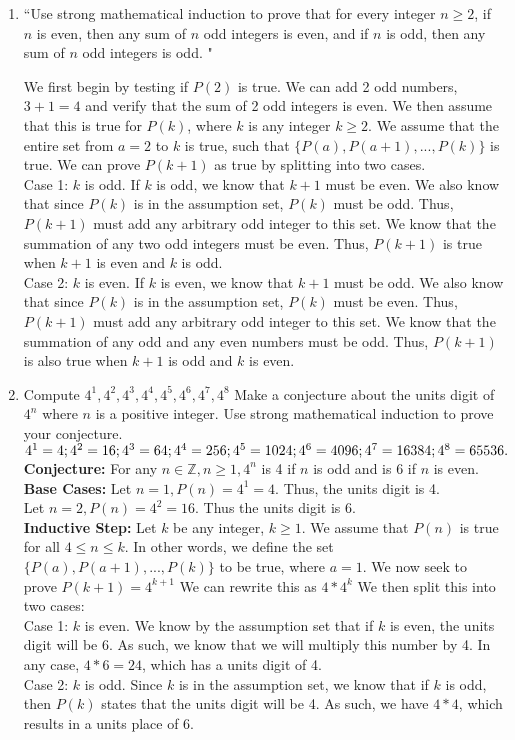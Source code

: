 \documentclass{article}
\makeatletter
\newcommand\setItemnumber[1]{\setcounter{enum\romannumeral\@enumdepth}{\numexpr#1-1\relax}}
\makeatother
\begin{document}
\begin{enumerate}
    \setItemnumber{16}
    \item ``Use strong mathematical induction to prove that for every integer $n\geq2$, if $n$ is even, then any sum of $n$ odd integers is even, and if $n$ is odd, then any sum of $n$ odd integers is odd. "

    We first begin by testing if $P(2)$ is true. We can add 2 odd numbers, $3+1 = 4$ and verify that the sum of 2 odd integers is even.
    We then assume that this is true for $P(k)$, where $k$ is any integer $k\geq2$. We assume that the entire set from $a=2$ to $k$ is true, such that $\{P(a), P(a+1),...,P(k)\}$ is true. We can prove $P(k+1)$ as true by splitting into two cases.\\
    Case 1: $k$ is odd. If $k$ is odd, we know that $k+1$ must be even. We also know that since $P(k)$ is in the assumption set, $P(k)$ must be odd. Thus, $P(k+1)$ must add any arbitrary odd integer to this set. We know that the summation of any two odd integers must be even. Thus, $P(k+1)$ is true when $k+1$ is even and $k$ is odd.\\
    Case 2: $k$ is even. If $k$ is even, we know that $k+1$ must be odd. We also know that since $P(k)$ is in the assumption set, $P(k)$ must be even. Thus, $P(k+1)$ must add any arbitrary odd integer to this set. We know that the summation of any odd and any even numbers must be odd. Thus, $P(k+1)$ is also true when $k+1$ is odd and $k$ is even.

    \item Compute $4^1, 4^2, 4^3, 4^4, 4^5, 4^6, 4^7, 4^8$ Make a conjecture about the units digit of $4^n$ where $n$ is a positive integer. Use strong mathematical induction to prove your conjecture.\\ $4^1 = 4; 4^2=16; 4^3=64; 4^4=256;\\ 4^5=1024; 4^6=4096; 4^7=16384; 4^8=65536.$\\
    \textbf{Conjecture:} For any $n\in\mathbb{Z},n\geq1,4^n$ is 4 if $n$ is odd and is 6 if $n$ is even. 
    \textbf{Base Cases:} Let $n=1, P(n)=4^1 = 4$. Thus, the units digit is 4.\\ Let $n=2, P(n)=4^2=16$. Thus the units digit is 6.\\
    \textbf{Inductive Step:} Let $k$ be any integer, $k\geq1$. We assume that $P(n)$ is true for all $4\leq n\leq k$. In other words, we define the set $\{P(a),P(a+1),...,P(k)\}$ to be true, where $a=1$. We now seek to prove $P(k+1) = 4^{k+1}$ We can rewrite this as $4*4^k$ We then split this into two cases:\\
    Case 1: $k$ is even. We know by the assumption set that if $k$ is even, the units digit will be 6. As such, we know that we will multiply this number by 4. In any case, $4*6=24$, which has a units digit of 4.\\
    Case 2: $k$ is odd. Since $k$ is in the assumption set, we know that if $k$ is odd, then $P(k)$ states that the units digit will be 4. As such, we have $4*4$, which results in a units place of 6.
\end{enumerate}
\end{document}
